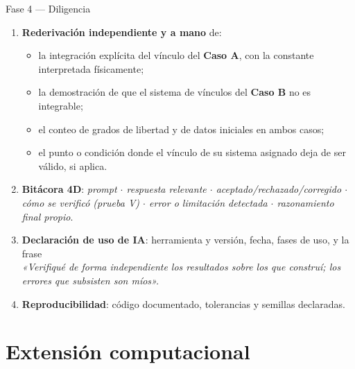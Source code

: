\documentclass[10pt,aspectratio=169]{beamer}
\begin{document}
\begin{frame}{Fase 4 --- Diligencia}
  \begin{enumerate}
    \item \textbf{Rederivación independiente y a mano} de:
      \begin{itemize}\small
        \item la integración explícita del vínculo del \textbf{Caso A}, con la constante interpretada físicamente;
        \item la demostración de que el sistema de vínculos del \textbf{Caso B} no es integrable;
        \item el conteo de grados de libertad y de datos iniciales en ambos casos;
        \item el punto o condición donde el vínculo de su sistema asignado deja de ser válido, si aplica.
      \end{itemize}
    \pause
    \item \textbf{Bitácora 4D}: \emph{prompt $\cdot$ respuesta relevante $\cdot$ aceptado/rechazado/corregido $\cdot$ cómo se verificó (prueba V) $\cdot$ error o limitación detectada $\cdot$ razonamiento final propio}.
    \pause
    \item \textbf{Declaración de uso de IA}: herramienta y versión, fecha, fases de uso, y la frase\\
      \emph{«Verifiqué de forma independiente los resultados sobre los que construí; los errores que subsisten son míos».}
    \pause
    \item \textbf{Reproducibilidad}: código documentado, tolerancias y semillas declaradas.
  \end{enumerate}
\end{frame}

\section{Extensión computacional}
\end{document}
